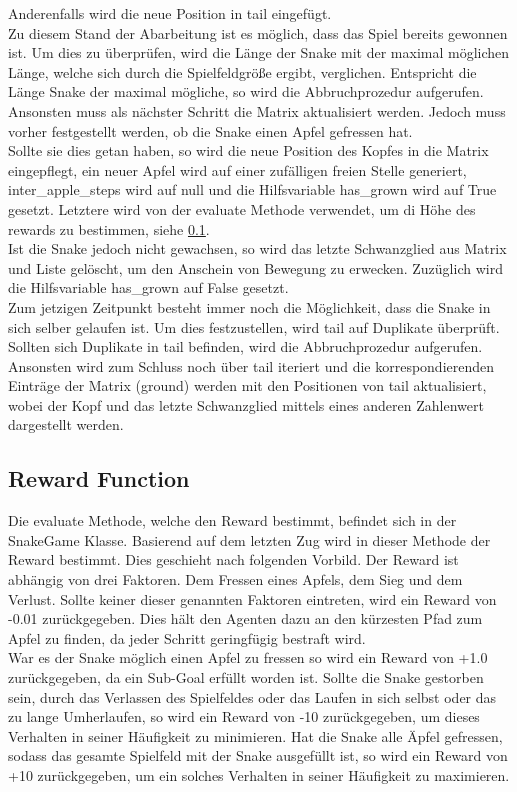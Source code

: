 Anderenfalls wird die neue Position in tail eingefügt.\\
Zu diesem Stand der Abarbeitung ist es möglich, dass das Spiel bereits gewonnen ist. Um dies zu überprüfen, wird die Länge der Snake mit der maximal möglichen Länge, welche sich durch die Spielfeldgröße ergibt, verglichen. Entspricht die Länge Snake der maximal mögliche, so wird die Abbruchprozedur aufgerufen.
Ansonsten muss als nächster Schritt die Matrix aktualisiert werden. Jedoch muss vorher festgestellt werden, ob die Snake einen Apfel gefressen hat.\\
Sollte sie dies getan haben, so wird die neue Position des Kopfes in die Matrix eingepflegt, ein neuer Apfel wird auf einer zufälligen freien Stelle generiert, inter\_apple\_steps wird auf null und die Hilfsvariable has\_grown wird auf True gesetzt. Letztere wird von der evaluate Methode verwendet, um di Höhe des rewards zu bestimmen, siehe \ref{sec:Impl_Reward_Function}.\\
Ist die Snake jedoch nicht gewachsen, so wird das letzte Schwanzglied aus Matrix und Liste gelöscht, um den Anschein von Bewegung zu erwecken. Zuzüglich wird  die Hilfsvariable has\_grown auf False gesetzt.\\
Zum jetzigen Zeitpunkt besteht immer noch die Möglichkeit, dass die Snake in sich selber gelaufen ist. Um dies festzustellen, wird tail auf Duplikate überprüft. Sollten sich Duplikate in tail befinden, wird die Abbruchprozedur aufgerufen.\\
Ansonsten wird zum Schluss noch über tail iteriert und die korrespondierenden Einträge der Matrix (ground) werden mit den Positionen von tail aktualisiert, wobei der Kopf und das letzte Schwanzglied mittels eines anderen Zahlenwert dargestellt werden.

\subsection{Reward Function} \label{sec:Impl_Reward_Function}
Die evaluate Methode, welche den Reward bestimmt, befindet sich in der SnakeGame Klasse. Basierend auf dem letzten Zug wird in dieser Methode der Reward bestimmt. Dies geschieht nach folgenden Vorbild.
Der Reward ist abhängig von drei Faktoren. Dem Fressen eines Apfels, dem Sieg und dem Verlust. Sollte keiner dieser genannten Faktoren eintreten, wird ein Reward von -0.01 zurückgegeben. Dies hält den Agenten dazu an den kürzesten Pfad zum Apfel zu finden, da jeder Schritt geringfügig bestraft wird.\\
War es der Snake möglich einen Apfel zu fressen so wird ein Reward von +1.0 zurückgegeben, da ein Sub-Goal erfüllt worden ist.
Sollte die Snake gestorben sein, durch das Verlassen des Spielfeldes oder das Laufen in sich selbst oder das zu lange Umherlaufen, so wird ein Reward von -10 zurückgegeben, um dieses Verhalten in seiner Häufigkeit zu minimieren.
Hat die Snake alle Äpfel gefressen, sodass das gesamte Spielfeld mit der Snake ausgefüllt ist, so wird ein Reward von +10 zurückgegeben, um ein solches Verhalten in seiner Häufigkeit zu maximieren.

